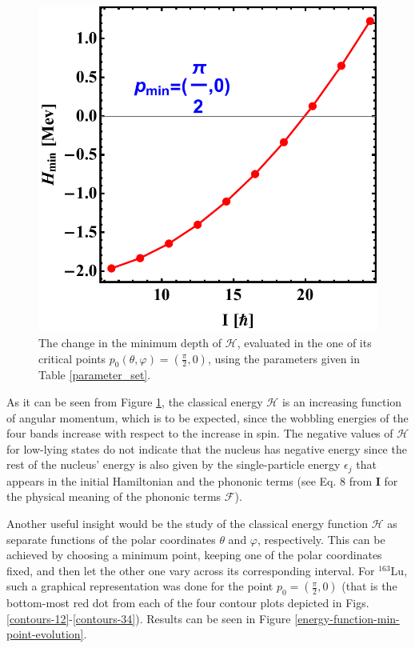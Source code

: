 \documentclass[myclassdoc,debug]{rjparticle}
\begin{document}
\begin{figure}
    \centering
    \includegraphics[scale=0.45]{figs/energy_function_minPoint_Evolution.pdf}
    \caption{The change in the minimum depth of $\mathcal{H}$, evaluated in the one of its critical points $p_0(\theta,\varphi)=(\frac{\pi}{2},0)$, using the parameters given in Table \ref{parameter_set}.}
    \label{energy-function-minimum-evolution}
\end{figure}

As it can be seen from Figure \ref{energy-function-minimum-evolution}, the classical energy $\mathcal{H}$ is an increasing function of angular momentum, which is to be expected, since the wobbling energies of the four bands increase with respect to the increase in spin. The negative values of $\mathcal{H}$ for low-lying states do not indicate that the nucleus has negative energy since the rest of the nucleus' energy is also given by the single-particle energy $\epsilon_j$ that appears in the initial Hamiltonian and the phononic terms (see Eq. 8 from \textbf{I} for the physical meaning of the phononic terms $\mathcal{F}$).

Another useful insight would be the study of the classical energy function $\mathcal{H}$ as separate functions of the polar coordinates $\theta$ and $\varphi$, respectively. This can be achieved by choosing a minimum point, keeping one of the polar coordinates fixed, and then let the other one vary across its corresponding interval. For $^{163}$Lu, such a graphical representation was done for the point $p_0=\left(\frac{\pi}{2},0\right)$ (that is the bottom-most red dot from each of the four contour plots depicted in Figs. \ref{contours-12}-\ref{contours-34}). Results can be seen in Figure \ref{energy-function-min-point-evolution}.
\end{document}
